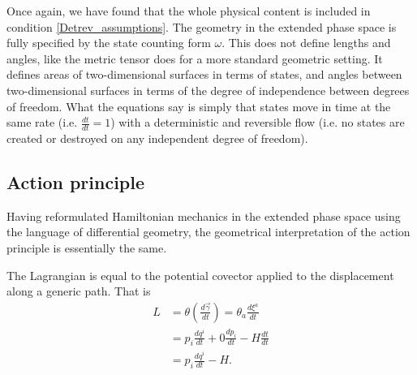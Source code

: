 \documentclass[10pt,twocolumn, nofootinbib]{revtex4-2}
\begin{document}
Once again, we have found that the whole physical content is included in condition \ref{Detrev_assumptions}. The geometry in the extended phase space is fully specified by the state counting form $\omega$. This does not define lengths and angles, like the metric tensor does for a more standard geometric setting. It defines areas of two-dimensional surfaces in terms of states, and angles between two-dimensional surfaces in terms of the degree of independence between degrees of freedom. What the equations say is simply that states move in time at the same rate (i.e. $\frac{dt}{dt} = 1$) with a deterministic and reversible flow (i.e. no states are created or destroyed on any independent degree of freedom).

\subsection{Action principle}
Having reformulated Hamiltonian mechanics in the extended phase space using the language of differential geometry, the geometrical interpretation of the action principle is essentially the same.

The Lagrangian is equal to the potential covector applied to the displacement along a generic path. That is
\begin{equation}
\begin{aligned}
L &= \theta\left(\frac{d\vec{\gamma}}{dt}\right) = \theta_a \frac{d\xi^a}{dt} \\
&= p_i \frac{dq^i}{dt} + 0 \frac{dp_i}{dt} - H \frac{dt}{dt} \\
&= p_i \frac{dq^i}{dt} - H.
\end{aligned}
\end{equation}
\end{document}
